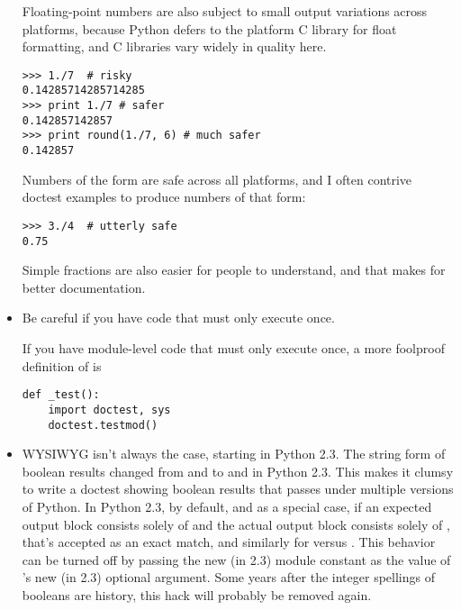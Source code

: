 \begin{itemize}
Floating-point numbers are also subject to small output variations across
platforms, because Python defers to the platform C library for float
formatting, and C libraries vary widely in quality here.

\begin{verbatim}
>>> 1./7  # risky
0.14285714285714285
>>> print 1./7 # safer
0.142857142857
>>> print round(1./7, 6) # much safer
0.142857
\end{verbatim}

Numbers of the form  are safe across all platforms, and I
often contrive doctest examples to produce numbers of that form:

\begin{verbatim}
>>> 3./4  # utterly safe
0.75
\end{verbatim}

Simple fractions are also easier for people to understand, and that makes
for better documentation.

\item Be careful if you have code that must only execute once.

If you have module-level code that must only execute once, a more foolproof
definition of  is

\begin{verbatim}
def _test():
    import doctest, sys
    doctest.testmod()
\end{verbatim}

\item WYSIWYG isn't always the case, starting in Python 2.3.  The
  string form of boolean results changed from  and
   to  and  in Python 2.3.
  This makes it clumsy to write a doctest showing boolean results that
  passes under multiple versions of Python.  In Python 2.3, by default,
  and as a special case, if an expected output block consists solely
  of  and the actual output block consists solely of
  , that's accepted as an exact match, and similarly for
   versus .  This behavior can be turned off by
  passing the new (in 2.3) module constant
   as the value of 's
  new (in 2.3) optional  argument.  Some years after
  the integer spellings of booleans are history, this hack will
  probably be removed again.

\end{itemize}


